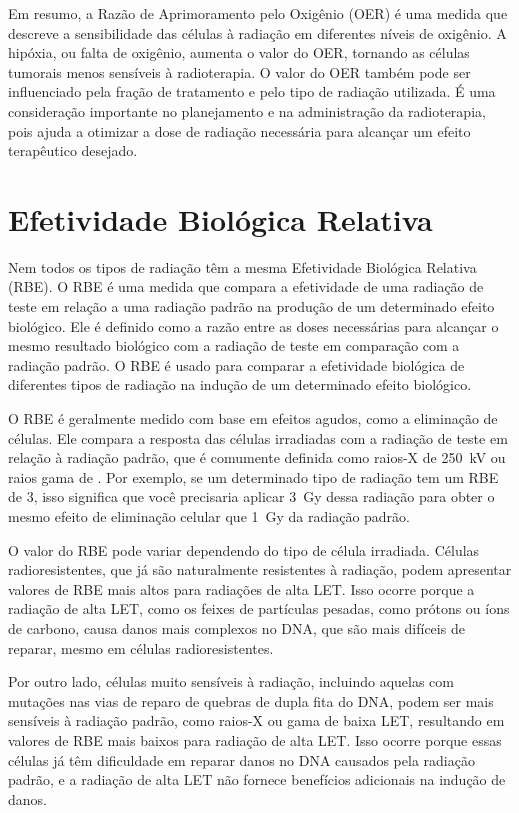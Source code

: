 \documentclass[11pt,a4paper]{article}
\newcounter{exemplo}
\begin{document}
	Em resumo, a Razão de Aprimoramento pelo Oxigênio (OER) é uma medida que descreve a sensibilidade das células à radiação em diferentes níveis de oxigênio. A hipóxia, ou falta de oxigênio, aumenta o valor do OER, tornando as células tumorais menos sensíveis à radioterapia. O valor do OER também pode ser influenciado pela fração de tratamento e pelo tipo de radiação utilizada. É uma consideração importante no planejamento e na administração da radioterapia, pois ajuda a otimizar a dose de radiação necessária para alcançar um efeito terapêutico desejado.

\section{Efetividade Biológica Relativa}

	Nem todos os tipos de radiação têm a mesma Efetividade Biológica Relativa (RBE). O RBE é uma medida que compara a efetividade de uma radiação de teste em relação a uma radiação padrão na produção de um determinado efeito biológico. Ele é definido como a razão entre as doses necessárias para alcançar o mesmo resultado biológico com a radiação de teste em comparação com a radiação padrão. O RBE é usado para comparar a efetividade biológica de diferentes tipos de radiação na indução de um determinado efeito biológico.

	O RBE é geralmente medido com base em efeitos agudos, como a eliminação de células. Ele compara a resposta das células irradiadas com a radiação de teste em relação à radiação padrão, que é comumente definida como raios-X de \SI{250}{\kilo\volt} ou raios gama de . Por exemplo, se um determinado tipo de radiação tem um RBE de 3, isso significa que você precisaria aplicar \SI{3}{\gray} dessa radiação para obter o mesmo efeito de eliminação celular que \SI{1}{\gray} da radiação padrão.

	O valor do RBE pode variar dependendo do tipo de célula irradiada. Células radioresistentes, que já são naturalmente resistentes à radiação, podem apresentar valores de RBE mais altos para radiações de alta LET. Isso ocorre porque a radiação de alta LET, como os feixes de partículas pesadas, como prótons ou íons de carbono, causa danos mais complexos no DNA, que são mais difíceis de reparar, mesmo em células radioresistentes.

	Por outro lado, células muito sensíveis à radiação, incluindo aquelas com mutações nas vias de reparo de quebras de dupla fita do DNA, podem ser mais sensíveis à radiação padrão, como raios-X ou gama de baixa LET, resultando em valores de RBE mais baixos para radiação de alta LET. Isso ocorre porque essas células já têm dificuldade em reparar danos no DNA causados pela radiação padrão, e a radiação de alta LET não fornece benefícios adicionais na indução de danos.
\end{document}
